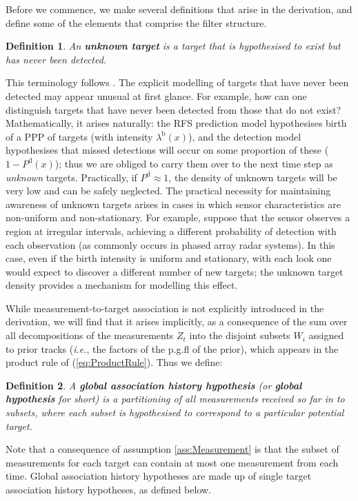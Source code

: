 \documentclass[journal,twoside]{IEEEtran}
\theoremstyle{plain}
\newtheorem{definition}{Definition}
\begin{document}
Before we commence, we make several definitions that arise in the derivation, and define some of the elements that comprise the filter structure.
%
\begin{definition}\label{def:Unknown}
An \textbf{unknown target} is a target that is hypothesised to exist but has never been detected. 
\end{definition}
%
This terminology follows \cite{Rei79,MorCho86}. The explicit modelling of targets that have never been detected may appear unusual at first glance. For example, how can one distinguish targets that have never been detected from those that do not exist? Mathematically, it arises naturally: the RFS prediction model hypothesises birth of a PPP of targets (with intensity $\lambda^\mathrm{b}(x)$), and the detection model hypothesises that missed detections will occur on some proportion of these ($1-P^{\mathrm{d}}(x)$); thus we are obliged to carry them over to the next time step as \emph{unknown} targets. Practically, if $P^{\mathrm{d}}\approx 1$, the density of unknown targets will be very low and can be safely neglected. The practical necessity for maintaining awareness of unknown targets arises in cases in which sensor characteristics are non-uniform and non-stationary. For example, suppose that the sensor observes a region at irregular intervals, achieving a different probability of detection with each observation (as commonly occurs in phased array radar systems). In this case, even if the birth intensity is uniform and stationary, with each look one would expect to discover a different number of new targets; the unknown target density provides a mechanism for modelling this effect.

While measurement-to-target association is not explicitly introduced in the derivation, we will find that it arises implicitly, as a consequence of the sum over all decompositions of the measurements $Z_t$ into the disjoint subsets $W_i$ assigned to prior tracks (\textit{i.e.}\xspace, the factors of the p.g.fl of the prior), which appears in the product rule of (\ref{eq:ProductRule}). Thus we define:
%
\begin{definition}\label{def:GlobalHypothesis}
A \textbf{global association history hypothesis} (or \textbf{global hypothesis} for short) is a partitioning of all measurements received so far in to subsets, where each subset is hypothesised to correspond to a particular potential target. 
\end{definition}
%
Note that a consequence of assumption \ref{ass:Measurement} is that the subset of measurements for each target can contain at most one measurement from each time. Global association history hypotheses are made up of single target association history hypotheses, as defined below.
\end{document}
